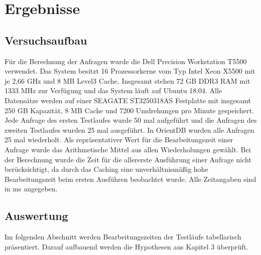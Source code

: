 
\chapter{Ergebnisse} %

\label{Kaptiel4} %

\section{Versuchsaufbau}
Für die Berechnung der Anfragen wurde die Dell Precision Workstation T5500 verwendet. Das System besitzt 16 Prozessorkerne vom Typ Intel Xeon  X5500 mit je 2,66 GHz und  8 MB Level3 Cache. Insgesamt stehen 72 GB DDR3 RAM mit 1333 MHz zur Verfügung und das System läuft auf Ubuntu 18.04. Alle Datensätze werden auf einer SEAGATE ST3250318AS Festplatte mit insgesamt 250 GB Kapazität, 8 MB Cache und 7200 Umdrehungen pro Minute gespeichert.\newline
 Jede Anfrage des ersten Testlaufes wurde 50 mal aufgeführt und die Anfragen des zweiten Testlaufes wurden 25 mal ausgeführt. In OrientDB wurden alle Anfragen 25 mal wiederholt. Als repräsentativer Wert für die Bearbeitungszeit einer Anfrage  wurde das Arithmetische Mittel aus allen Wiederholungen gewählt. Bei der Berechnung wurde die Zeit für die allererste Ausführung einer Anfrage nicht berücksichtigt, da durch das Caching eine unverhältnismäßig hohe Bearbeitungszeit beim ersten Ausführen beobachtet wurde. Alle Zeitangaben sind in ms angegeben. 
\section{Auswertung}
Im folgenden Abschnitt werden Bearbeitungszeiten der Testläufe tabellarisch präsentiert.  Darauf aufbauend werden die Hypothesen aus Kapitel 3 überprüft.  
